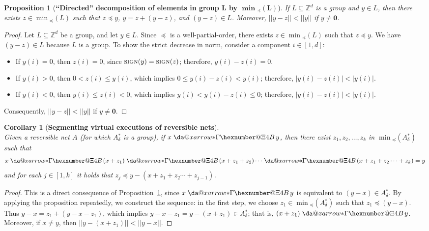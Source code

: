 \documentclass[11pt,a4paper]{amsart}
\makeatletter
\newcommand{\virtual}[1]{\mathrel{\xdashrightarrow{#1}}\hspace{-0.3em}}
\newcommand{\vreach}{\virtual{*}}
\newcommand{\sleq}{\preceq}
\newcommand{\minsleq}[1]{\min{}_\sleq(#1)}
\newcommand{\sign}{\textsc{sign}}
\newcommand{\D}{{}_{\delta}}
\newcommand{\nnorm}[1]{||#1||}
\newcommand{\Zset}{\mathbb{Z}}
\newcommand{\setZ}{\Zset}
\newcommand*{\da@rightarrow}{\mathchar"0\hexnumber@\symAMSa 4B }
\newcommand*{\xdashrightarrow}[2][]{%
  \mathrel{%
    \mathpalette{\da@xarrow{#1}{#2}{}\da@rightarrow{\,}{}}{}%
  }%
}
\newcommand*{\da@xarrow}[7]{%
  \sbox0{$\ifx#7\scriptstyle\scriptscriptstyle\else\scriptstyle\fi#5#1#6\m@th$}%
  \sbox2{$\ifx#7\scriptstyle\scriptscriptstyle\else\scriptstyle\fi#5#2#6\m@th$}%
  \sbox4{$#7\dabar@\m@th$}%
  \dimen@=\wd0 %
  \ifdim\wd2 >\dimen@
    \dimen@=\wd2 %
  \fi
  \count@=2 %
  \def\da@bars{\dabar@\dabar@}%
  \@whiledim\count@\wd4<\dimen@\do{%
    \advance\count@\@ne
    \expandafter\def\expandafter\da@bars\expandafter{%
      \da@bars
      \dabar@ 
    }%
  }%
  \mathrel{#3}%
  \mathrel{%
    \mathop{\da@bars}\limits
    \ifx\\#1\\%
    \else
      _{\copy0}%
    \fi
    \ifx\\#2\\%
    \else
      ^{\copy2}%
    \fi
  }%
  \mathrel{#4}%
}
\let\origtextsc\textsc
\renewcommand{\textsc}[1]{\textnormal{\origtextsc{#1}}}
\theoremstyle{plain}
\newtheorem{cor}[thm]{Corollary}
\newtheorem{prop}[thm]{Proposition}
\theoremstyle{definition}
\theoremstyle{defC}
\theoremstyle{thmC}
\makeatother
\begin{document}
\begin{prop}[\textbf{``Directed'' decomposition of elements in group $\bm{L}$ by
	$\bm{\minsleq{L}}$}]\label{prop:onestepsubgroup}
	If $L\subseteq \setZ^d$ is a group and
	$y\in L$, then there exists $z\in\minsleq{L}$ such that
	$z\sleq y$, $y=z+(y-z)$,   
	and $(y-z)\in L$. Moreover, $\nnorm{y-z}<\nnorm{y}$
 if $y\neq\mathbf{0}$.
\end{prop}	
\begin{proof}
Let $L\subseteq \setZ^d$ be a group, and
let $y\in L$.
	Since $\sleq$ is a well-partial-order, there exists $z\in\minsleq{L}$ such that $z\sleq
	y$. We have $(y-z)\in L$ because $L$ is a group.
To show the strict decrease in norm, consider a component $i\in[1,d]$:
	\begin{itemize}
		\item
			If $y(i)=0$, then $z(i)=0$, since
			$\sign(y)=\sign(z)$; therefore, $y(i)-z(i)=0$.
\item
If $y(i)>0$, then $0<z(i)\leq y(i)$, 
which implies $0\leq y(i)-z(i)<y(i)$; therefore,
$|y(i)-z(i)|<|y(i)|$.
\item
If $y(i)<0$, then $y(i)\leq z(i)<0$, 
			which implies $y(i)<y(i)-z(i)\leq 0$;
			therefore, 
$|y(i)-z(i)|<|y(i)|$.
\end{itemize}
Consequently, $\nnorm{y-z}<\nnorm{y}$ if
	$y\neq\mathbf{0}$.
\end{proof}

\begin{cor}[\textbf{Segmenting virtual executions of reversible nets}]\label{cor:subgroup}
\hfill\\
	Given a reversible net $A$ (for which $A\D^*$ is a group), if
	$x\virtual{*}y$, then 
	there exist $z_1,z_2,\dots,z_k$ in $\minsleq{A\D^*}$
such that
\begin{equation}\label{eq:decompseq}
x\virtual{*}(x+z_1)\virtual{*}(x+z_1+z_2)\cdots\virtual{*}(x+z_1+z_2\cdots
	+z_k)=y
\end{equation}	
and for each $j\in[1,k]$ it holds that
 $z_j\sleq y-(x+z_1+z_2\cdots +z_{j-1})$.
\end{cor}
\begin{proof}
This is a direct consequence of Proposition~\ref{prop:onestepsubgroup},
since $x\virtual{*}y$ is equivalent to $(y-x)\in A\D^*$. 
By applying the proposition repeatedly, we construct the sequence:
in the first step, we choose
$z_1\in\minsleq{A\D^*}$ such that 
$z_1\sleq (y-x)$. Thus $y-x=z_1+(y-x-z_1)$, which implies
$y-x-z_1=y-(x+z_1)\in A\D^*$; that is,
$(x+z_1)\vreach y$. Moreover, if  $x\neq y$, then
$\nnorm{y-(x+z_1)}<\nnorm{y-x}$.
\end{proof}
\end{document}
